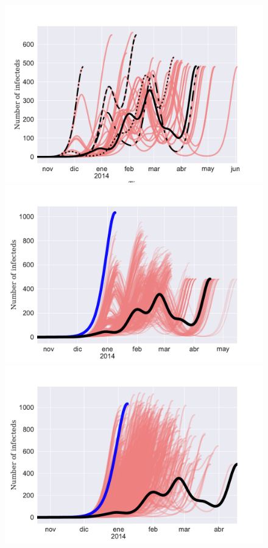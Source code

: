 \documentclass[11pt]{article}
\begin{document}
\begin{figure}[ht]
\centering
\includegraphics[scale=.45]{./scenario4_scenarioB-2}\\
\includegraphics[scale=.30]{./scenario_A_2peak_2}
\includegraphics[scale=.30]{./scenario_ER_network_2}

\end{figure}
\end{document}
